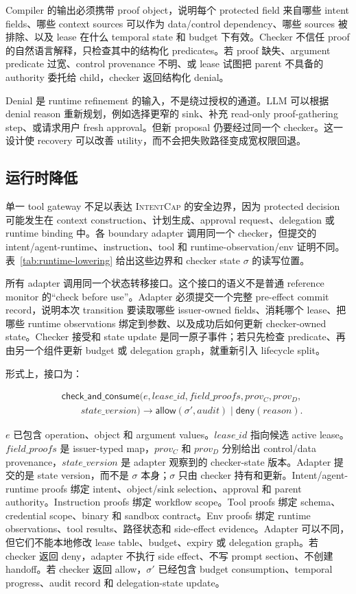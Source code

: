 \documentclass[UTF8,a4paper,11pt]{ctexart}
\newcommand{\sys}{\textsc{IntentCap}\xspace}
\begin{document}
Compiler 的输出必须携带 proof object，说明每个 protected field 来自哪些 intent fields、哪些 context sources 可以作为 data/control dependency、哪些 sources 被排除、以及 lease 在什么 temporal state 和 budget 下有效。Checker 不信任 proof 的自然语言解释，只检查其中的结构化 predicates。若 proof 缺失、argument predicate 过宽、control provenance 不明、或 lease 试图把 parent 不具备的 authority 委托给 child，checker 返回结构化 denial。

Denial 是 runtime refinement 的输入，不是绕过授权的通道。LLM 可以根据 denial reason 重新规划，例如选择更窄的 sink、补充 read-only proof-gathering step、或请求用户 fresh approval。但新 proposal 仍要经过同一个 checker。这一设计使 recovery 可以改善 utility，而不会把失败路径变成宽权限回退。

\subsection{运行时降低}

单一 tool gateway 不足以表达 \sys 的安全边界，因为 protected decision 可能发生在 context construction、计划生成、approval request、delegation 或 runtime binding 中。各 boundary adapter 调用同一个 checker，但提交的 intent/agent-runtime、instruction、tool 和 runtime-observation/env 证明不同。表~\ref{tab:runtime-lowering} 给出这些边界和 checker state \(\sigma\) 的读写位置。

所有 adapter 调用同一个状态转移接口。这个接口的语义不是普通 reference monitor 的“check before use”。Adapter 必须提交一个完整 pre-effect commit record，说明本次 transition 要读取哪些 issuer-owned fields、消耗哪个 lease、把哪些 runtime observations 绑定到参数、以及成功后如何更新 checker-owned state。Checker 接受和 state update 是同一原子事件；若只先检查 predicate、再由另一个组件更新 budget 或 delegation graph，就重新引入 lifecycle split。

形式上，接口为：

\[
\begin{aligned}
&\mathsf{check\_and\_consume}(e,lease\_id,field\_proofs,prov_C,prov_D,\\
&\qquad state\_version)
\rightarrow \mathsf{allow}(\sigma',audit) \mid \mathsf{deny}(reason).
\end{aligned}
\]

\(e\) 已包含 operation、object 和 argument values。\(lease\_id\) 指向候选 active lease。\(field\_proofs\) 是 issuer-typed map，\(prov_C\) 和 \(prov_D\) 分别给出 control/data provenance，\(state\_version\) 是 adapter 观察到的 checker-state 版本。Adapter 提交的是 state version，而不是 \(\sigma\) 本身；\(\sigma\) 只由 checker 持有和更新。Intent/agent-runtime proofs 绑定 intent、object/sink selection、approval 和 parent authority。Instruction proofs 绑定 workflow scope。Tool proofs 绑定 schema、credential scope、binary 和 sandbox contract。Env proofs 绑定 runtime observations、tool results、路径状态和 side-effect evidence。Adapter 可以不同，但它们不能本地修改 lease table、budget、expiry 或 delegation graph。若 checker 返回 deny，adapter 不执行 side effect、不写 prompt section、不创建 handoff。若 checker 返回 allow，\(\sigma'\) 已经包含 budget consumption、temporal progress、audit record 和 delegation-state update。
\end{document}

